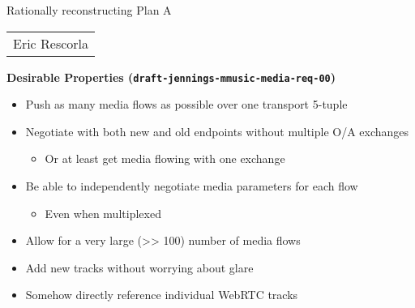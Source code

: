 \documentclass[helvetica]{seminar}
\newcommand{\heading}[1]{%
  \begin{center} 
    \large\bf 
    #1 
  \end{center} 
  \vspace{.4 in}}
\begin{document}
\begin{slide}
\begin{center}
\vspace{1 in}
\LARGE{{\bf}Rationally reconstructing Plan A}\\
\vspace{.2in}
\vspace{3em}
\large{
\begin{tabular}{c}
Eric Rescorla\\
\end{tabular}
}
\end{center}

\end{slide}

\centerslidesfalse 


\begin{slide}
\heading{Desirable Properties (\texttt{draft-jennings-mmusic-media-req-00})}

\begin{itemize}
\item Push as many media flows as possible over one transport 5-tuple
\item Negotiate with both new and old endpoints without multiple O/A exchanges
  \begin{itemize}
  \item Or at least get media flowing with one exchange
  \end{itemize}
\item Be able to independently negotiate media parameters for each flow
  \begin{itemize}
  \item Even when multiplexed
  \end{itemize}
\item Allow for a very large (>> 100) number of media flows
\item Add new tracks without worrying about glare
\item Somehow directly reference individual WebRTC tracks
\end{itemize}
\end{slide}
\end{document}
